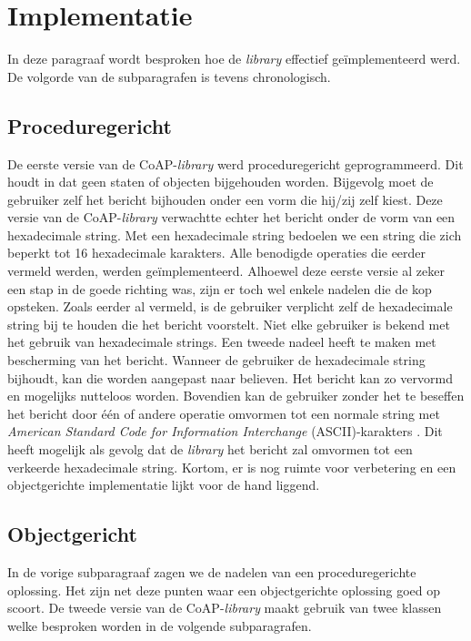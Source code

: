 \section{Implementatie}

In deze paragraaf wordt besproken hoe de \textit{library} effectief ge\"{i}mplementeerd werd. De volgorde van de subparagrafen is tevens chronologisch. 

\subsection{Proceduregericht}

De eerste versie van de CoAP-\textit{library} werd proceduregericht geprogrammeerd. Dit houdt in dat geen staten of objecten bijgehouden worden. Bijgevolg moet de gebruiker zelf het bericht bijhouden onder een vorm die hij/zij zelf kiest. Deze versie van de CoAP-\textit{library} verwachtte echter het bericht onder de vorm van een hexadecimale string. Met een hexadecimale string bedoelen we een string die zich beperkt tot 16 hexadecimale karakters. Alle benodigde operaties die eerder vermeld werden, werden ge\"{i}mplementeerd. Alhoewel deze eerste versie al zeker een stap in de goede richting was, zijn er toch wel enkele nadelen die de kop opsteken. Zoals eerder al vermeld, is de gebruiker verplicht zelf de hexadecimale string bij te houden die het bericht voorstelt. Niet elke gebruiker is bekend met het gebruik van hexadecimale strings. Een tweede nadeel heeft te maken met bescherming van het bericht. Wanneer de gebruiker de hexadecimale string bijhoudt, kan die worden aangepast naar believen. Het bericht kan zo vervormd en mogelijks nutteloos worden. Bovendien kan de gebruiker zonder het te beseffen het bericht door \'{e}\'{e}n of andere operatie omvormen tot een normale string met \textit{American Standard Code for Information Interchange} (ASCII)-karakters . Dit heeft mogelijk als gevolg dat de \textit{library} het bericht zal omvormen tot een verkeerde hexadecimale string. Kortom, er is nog ruimte voor verbetering en een objectgerichte implementatie lijkt voor de hand liggend.

\subsection{Objectgericht}

In de vorige subparagraaf zagen we de nadelen van een proceduregerichte oplossing. Het zijn net deze punten waar een objectgerichte oplossing goed op scoort. De tweede versie van de CoAP-\textit{library} maakt gebruik van twee klassen welke besproken worden in de volgende subparagrafen.

